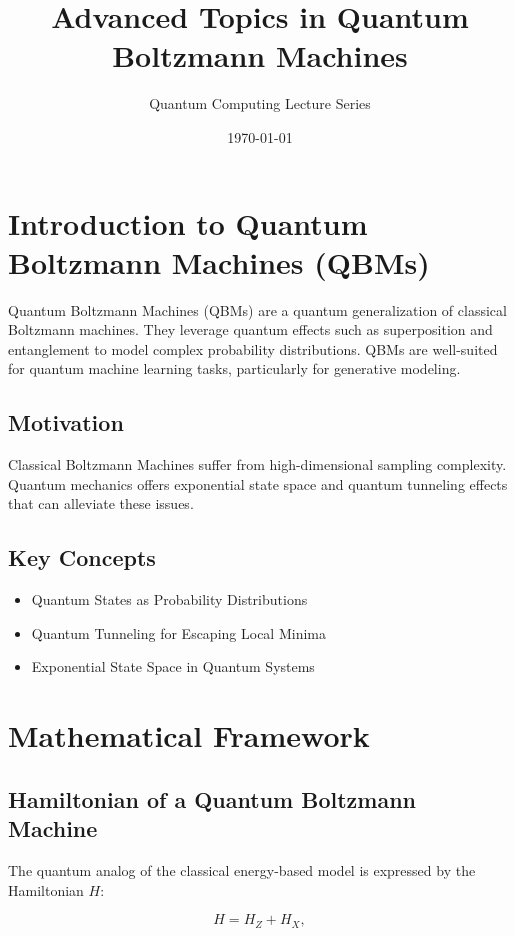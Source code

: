 \documentclass[11pt]{article}
\title{Advanced Topics in Quantum Boltzmann Machines}
\author{Quantum Computing Lecture Series}
\date{\today}
\begin{document}
\maketitle
\tableofcontents
\newpage

\section{Introduction to Quantum Boltzmann Machines (QBMs)}
Quantum Boltzmann Machines (QBMs) are a quantum generalization of classical Boltzmann machines. They leverage quantum effects such as superposition and entanglement to model complex probability distributions. QBMs are well-suited for quantum machine learning tasks, particularly for generative modeling. 

\subsection{Motivation}
Classical Boltzmann Machines suffer from high-dimensional sampling complexity. Quantum mechanics offers exponential state space and quantum tunneling effects that can alleviate these issues.

\subsection{Key Concepts}
\begin{itemize}
    \item Quantum States as Probability Distributions
    \item Quantum Tunneling for Escaping Local Minima
    \item Exponential State Space in Quantum Systems
\end{itemize}

\section{Mathematical Framework}
\subsection{Hamiltonian of a Quantum Boltzmann Machine}
The quantum analog of the classical energy-based model is expressed by the Hamiltonian \( H \):

\begin{equation}
    H = H_Z + H_X,
\end{equation}
\end{document}
